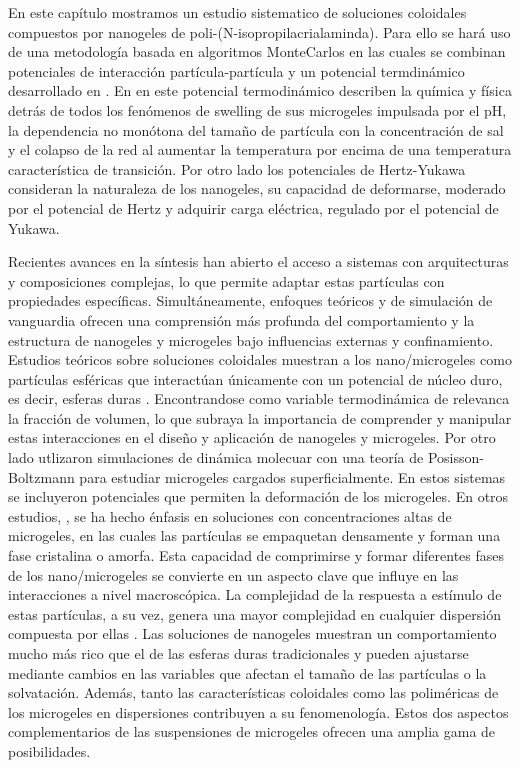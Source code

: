 	En este cap\'itulo mostramos un estudio sistematico de soluciones coloidales compuestos por nanogeles de poli-(N-isopropilacrialaminda). Para ello se har\'a uso de una metodolog\'ia basada en algoritmos MonteCarlos en las cuales se combinan potenciales de interacci\'on part\'icula-part\'icula  y un potencial termdin\'amico desarrollado en \cite{perez2021thermodynamic}. En en este potencial termodin\'amico \citet{perez2021thermodynamic} describen la qu\'imica y f\'isica detr\'as de todos los fen\'omenos de swelling de sus microgeles impulsada por el pH, la dependencia no mon\'otona del tama\~no de part\'icula con la concentraci\'on de sal y el colapso de la red al aumentar la temperatura por encima de una temperatura caracter\'istica de transici\'on.
	Por otro lado los potenciales de Hertz-Yukawa consideran la naturaleza de los nanogeles, su capacidad de deformarse, moderado por el potencial de Hertz y adquirir carga el\'ectrica, regulado por el potencial de Yukawa.
	
	
	Recientes avances en la s\'intesis han abierto el acceso a sistemas con arquitecturas y composiciones complejas, lo que permite adaptar estas part\'iculas  con propiedades espec\'ificas. 
	Simult\'aneamente, enfoques te\'oricos y de simulaci\'on de vanguardia ofrecen una comprensi\'on m\'as profunda del comportamiento y la estructura de nanogeles y microgeles bajo influencias externas y confinamiento. 
	Estudios te\'oricos sobre soluciones coloidales muestran a los nano/microgeles como part\'iculas esf\'ericas que interact\'uan \'unicamente con un potencial de n\'ucleo duro, es decir, esferas duras \cite{karg2019nanogels}. Encontrandose como variable termodin\'amica de relevanca la fracci\'on de volumen, lo que subraya la importancia de comprender y manipular estas interacciones en el dise\~no y aplicaci\'on de nanogeles y microgeles. Por otro lado
	\citet{alziyadi2023osmotic} utlizaron simulaciones de din\'amica molecuar con una teor\'ia de Posisson-Boltzmann para estudiar microgeles cargados superficialmente. En estos sistemas se incluyeron potenciales que permiten la deformaci\'on de los microgeles.
	En otros estudios, \cite{scotti2022softness,scheffold2020pathways}, se ha hecho \'enfasis en soluciones con concentraciones altas de microgeles, en las cuales  las part\'iculas se empaquetan densamente y forman una fase cristalina o amorfa. Esta capacidad de comprimirse y formar diferentes fases de los nano/microgeles se convierte en un aspecto clave que influye en las interacciones a nivel macrosc\'opica.
	La complejidad de la respuesta a est\'imulo de estas part\'iculas, a su vez, genera una mayor complejidad en cualquier dispersi\'on compuesta por ellas \cite{lyon2012polymer}. Las soluciones de nanogeles muestran un comportamiento mucho m\'as rico que el de las esferas duras tradicionales y pueden ajustarse mediante cambios en las variables que afectan el tama\~no de las part\'iculas o la solvataci\'on. Adem\'as, tanto las caracter\'isticas coloidales como las polim\'ericas de los microgeles en dispersiones contribuyen a su fenomenolog\'ia. Estos dos aspectos complementarios de las suspensiones de microgeles ofrecen una amplia gama de posibilidades.
	

